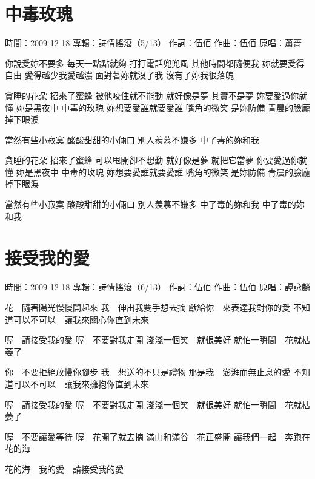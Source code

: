\documentclass[UTF8,a4paper,oneside,twocolumn,12pt]{ctexbook}
\newcommand{\infopair}[2]{\textbullet #1：#2}
\newcommand{\zc}[1][伍佰]{\infopair{作詞}{#1}}
\newcommand{\zq}[1][伍佰]{\infopair{作曲}{#1}}
\newcommand{\zj}[1]{\infopair{專輯}{#1}}
\newcommand{\yc}[1]{\infopair{原唱}{#1}}
\newcommand{\sj}[1]{\infopair{時間}{#1}}
\newenvironment{info}{\begin{flushleft}\kaishu
	}
	{\end{flushleft}\normalsize\yahei\par}
\newenvironment{lyric}{
	}
{}
\begin{document}
\section{中毒玫瑰}
\begin{info}
	\sj{2009-12-18}
	\zj{詩情搖滾（5/13）}
	\zc
	\zq
	\yc{蕭薔}
\end{info}
\begin{lyric}
	你說愛妳不要多 每天一點點就夠
	打打電話兜兜風 其他時間都隨便我
	妳就要愛得自由 愛得越少我愛越濃
	面對著妳就沒了我 沒有了妳我很落魄

	貪睡的花朵 招來了蜜蜂
	被他咬住就不能動
	就好像是夢 其實不是夢
	妳要愛過你就懂
	妳是黑夜中 中毒的玫瑰
	妳想要愛誰就要愛誰
	嘴角的微笑 是妳防備
	青晨的臉龐 掉下眼淚

	當然有些小寂寞 酸酸甜甜的小倆口
	別人羨慕不嫌多 中了毒的妳和我

	貪睡的花朵 招來了蜜蜂
	可以甩開卻不想動
	就好像是夢 就把它當夢
	你要愛過你就懂
	妳是黑夜中 中毒的玫瑰
	妳想要愛誰就要愛誰
	嘴角的微笑 是妳防備
	青晨的臉龐 掉下眼淚

	當然有些小寂寞 酸酸甜甜的小倆口
	別人羨慕不嫌多 中了毒的妳和我 中了毒的妳和我
\end{lyric}

\section{接受我的愛}
\begin{info}
	\sj{2009-12-18}
	\zj{詩情搖滾（6/13）}
	\zc
	\zq
	\yc{譚詠麟}
\end{info}
\begin{lyric}
	花　隨著陽光慢慢開起來
	我　伸出我雙手想去摘
	獻給你　來表達我對你的愛
	不知道可以不可以　讓我來關心你直到未來

	喔　請接受我的愛
	喔　不要對我走開
	淺淺一個笑　就很美好
	就怕一瞬間　花就枯萎了

	你　不要拒絕放慢你腳步
	我　想送的不只是禮物
	那是我　澎湃而無止息的愛
	不知道可以不可以　讓我來擁抱你直到未來

	喔　請接受我的愛
	喔　不要對我走開
	淺淺一個笑　就很美好
	就怕一瞬間　花就枯萎了

	喔　不要讓愛等待
	喔　花開了就去摘
	滿山和滿谷　花正盛開
	讓我們一起　奔跑在花的海

	花的海　我的愛　請接受我的愛
\end{lyric}
\end{document}
